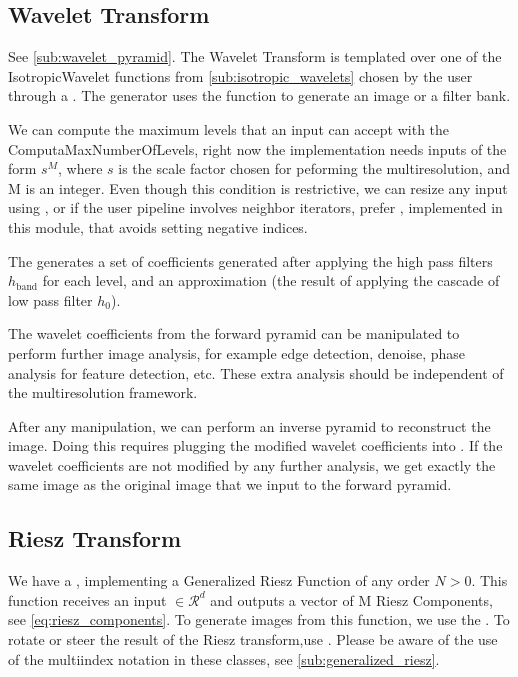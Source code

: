\subsection{Wavelet Transform}
\label{sub:wavelet_transform_impl}

See \autoref{sub:wavelet_pyramid}. The Wavelet Transform is templated over one of the IsotropicWavelet functions from \autoref{sub:isotropic_wavelets} chosen by the user through a . The generator uses the function to generate an image or a filter bank.

We can compute the maximum levels that an input can accept with the ComputaMaxNumberOfLevels, right now the implementation needs inputs of the form $s^M$, where $s$ is the scale factor chosen for peforming the multiresolution, and M is an integer. Even though this condition is restrictive, we can resize any input using , or if the user pipeline involves neighbor iterators, prefer , implemented in this module, that avoids setting negative indices.

The  generates a set of coefficients generated after applying the high pass filters $h_{\text{band}}$ for each level, and an approximation (the result of applying the cascade of low pass filter $h_0$).

The wavelet coefficients from the forward pyramid can be manipulated to perform further image analysis, for example edge detection, denoise, phase analysis for feature detection, etc. These extra analysis should be independent of the multiresolution framework.

After any manipulation, we can perform an inverse pyramid to reconstruct the image. Doing this requires plugging the modified wavelet coefficients into . If the wavelet coefficients are not modified by any further analysis, we get exactly the same image as the original image that we input to the forward pyramid.

\subsection{Riesz Transform}
\label{sub:riesz_transform_impl}

We have a , implementing a Generalized Riesz Function \cite{unser_steerable_2011} of any order $N>0$. This function receives an input $\in \mathcal{R}^d$ and outputs a vector of M Riesz Components, see \autoref{eq:riesz_components}. To generate images from this function, we use the . To rotate or steer the result of the Riesz transform,use . Please be aware of the use of the multiindex notation in these classes, see \autoref{sub:generalized_riesz}.


